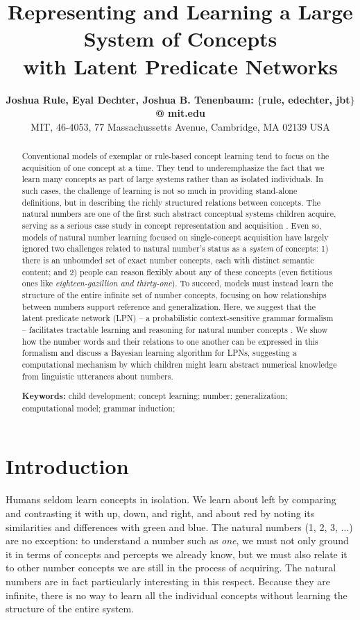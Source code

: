 \documentclass[10pt,letterpaper]{article}
\title{Representing and Learning a Large System of Concepts\\with Latent Predicate Networks}
\author{
  {\large \bf Joshua Rule, Eyal Dechter, Joshua B. Tenenbaum: $\{$rule, edechter, jbt$\}$ @ mit.edu}\\
  MIT, 46-4053, 77 Massachussetts Avenue, Cambridge, MA 02139 USA}
\begin{document}
\maketitle

\begin{abstract}
  Conventional models of exemplar or rule-based concept learning tend
  to focus on the acquisition of one concept at a time. They tend to
  underemphasize the fact that we learn many concepts as part of large
  systems rather than as isolated individuals. In such cases, the
  challenge of learning is not so much in providing stand-alone
  definitions, but in describing the richly structured relations
  between concepts. The natural numbers are one of the first such
  abstract conceptual systems children acquire, serving as a serious
  case study in concept representation and acquisition
  \citep{fuson1988children,galGel2005,Car2009}. Even so, models of
  natural number learning focused on single-concept acquisition have
  largely ignored two challenges related to natural number's status as
  a \emph{system} of concepts: 1) there is an unbounded set of exact
  number concepts, each with distinct semantic content; and 2) people
  can reason flexibly about any of these concepts (even fictitious
  ones like \emph{eighteen-gazillion and thirty-one}). To succeed,
  models must instead learn the structure of the entire infinite set
  of number concepts, focusing on how relationships between numbers
  support reference and generalization.  Here, we suggest that the
  latent predicate network (LPN) -- a probabilistic context-sensitive
  grammar formalism -- facilitates tractable learning and reasoning
  for natural number concepts \citep{DecRulTen2015}. We show how the
  number words and their relations to one another can be expressed in
  this formalism and discuss a Bayesian learning algorithm for LPNs,
  suggesting a computational mechanism by which children might learn
  abstract numerical knowledge from linguistic utterances about
  numbers.

  \textbf{Keywords:}
  child development; concept learning; number; generalization;
  computational model; grammar induction;
\end{abstract}

\section{Introduction}

Humans seldom learn concepts in isolation. We learn about left by
comparing and contrasting it with up, down, and right, and about red
by noting its similarities and differences with green and blue. The
natural numbers (1, 2, 3, $\ldots$) are no exception: to understand a
number such as \emph{one}, we must not only ground it in terms of
concepts and percepts we already know, but we must also relate it to
other number concepts we are still in the process of acquiring. The
natural numbers are in fact particularly interesting in this respect.
Because they are infinite, there is no way to learn all the individual
concepts without learning the structure of the entire system.
\end{document}
